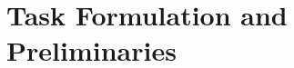 \documentclass[runningheads]{llncs}
\begin{document}

\section{Task Formulation and Preliminaries}
\end{document}
